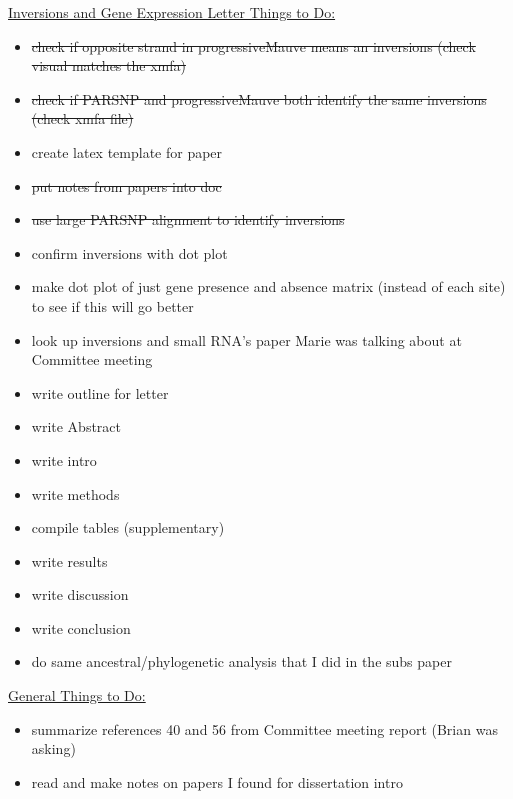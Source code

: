 \documentclass[12pt]{article}
\newcommand{\p}{progressiveMauve\xspace}
\newcommand{\ecoli}{\textit{Escherichia coli}\xspace}
\begin{document}
\underline{Inversions and Gene Expression Letter Things to Do:}
\begin{itemize}
%	
%	
%	
%	
	\item \sout{check if opposite strand in \p means an inversions (check visual matches the xmfa)}
	
	\item \sout{check if PARSNP and \p both identify the same inversions (check xmfa file)}
	\item create latex template for paper
	\item \sout{put notes from papers into doc}
	\item \sout{use large PARSNP alignment to identify inversions}
	\item confirm inversions with dot plot
	\item make dot plot of just gene presence and absence matrix (instead of each site) to see if this will go better
	\item look up inversions and small RNA's paper Marie was talking about at Committee meeting
	\item write outline for letter
	\item write Abstract
	\item write intro
	\item write methods
	\item compile tables (supplementary)
	\item write results
	\item write discussion
	\item write conclusion 
	\item do same ancestral/phylogenetic analysis that I did in the subs paper 
\end{itemize}

\underline{General Things to Do:}
\begin{itemize}
	\item summarize references 40 and 56 from Committee meeting report (Brian was asking)
	
	\item read and make notes on papers I found for dissertation intro
	
	
\end{itemize}
\end{document}

